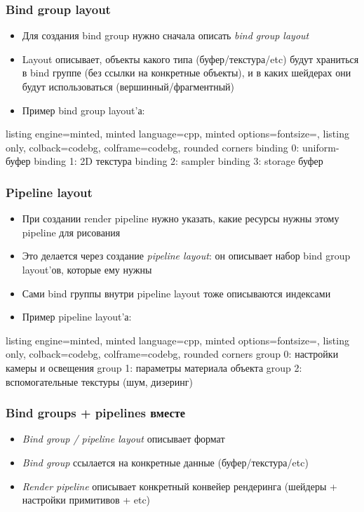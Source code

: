 \documentclass[10pt]{beamer}
\begin{document}
\begin{frame}[fragile]
\frametitle{Bind group layout}
\begin{itemize}
\item Для создания bind group нужно сначала описать \textit{bind group layout}
\pause
\item Layout описывает, объекты какого типа (буфер/текстура/etc) будут храниться в bind группе (без ссылки на конкретные объекты), и в каких шейдерах они будут использоваться (вершинный/фрагментный)
\pause
\item Пример bind group layout'а:
\end{itemize}
\begin{tcblisting}{listing engine=minted, minted language=cpp, minted options={fontsize=\scriptsize}, listing only, colback=codebg, colframe=codebg, rounded corners}
binding 0: uniform-буфер
binding 1: 2D текстура
binding 2: sampler
binding 3: storage буфер
\end{tcblisting}
\end{frame}

\begin{frame}[fragile]
\frametitle{Pipeline layout}
\begin{itemize}
\item При создании render pipeline нужно указать, какие ресурсы нужны этому pipeline для рисования
\pause
\item Это делается через создание \textit{pipeline layout}: он описывает набор bind group layout'ов, которые ему нужны
\pause
\item Сами bind группы внутри pipeline layout тоже описываются индексами
\pause
\item Пример pipeline layout'а:
\end{itemize}
\begin{tcblisting}{listing engine=minted, minted language=cpp, minted options={fontsize=\scriptsize}, listing only, colback=codebg, colframe=codebg, rounded corners}
group 0: настройки камеры и освещения
group 1: параметры материала объекта
group 2: вспомогательные текстуры (шум, дизеринг)
\end{tcblisting}
\end{frame}

\begin{frame}[fragile]
\frametitle{Bind groups + pipelines вместе}
\begin{itemize}
\item \textit{Bind group / pipeline layout} описывает формат
\pause
\item \textit{Bind group} ссылается на конкретные данные (буфер/текстура/etc)
\pause
\item \textit{Render pipeline} описывает конкретный конвейер рендеринга (шейдеры + настройки примитивов + etc)
\end{itemize}
\end{frame}
\end{document}
